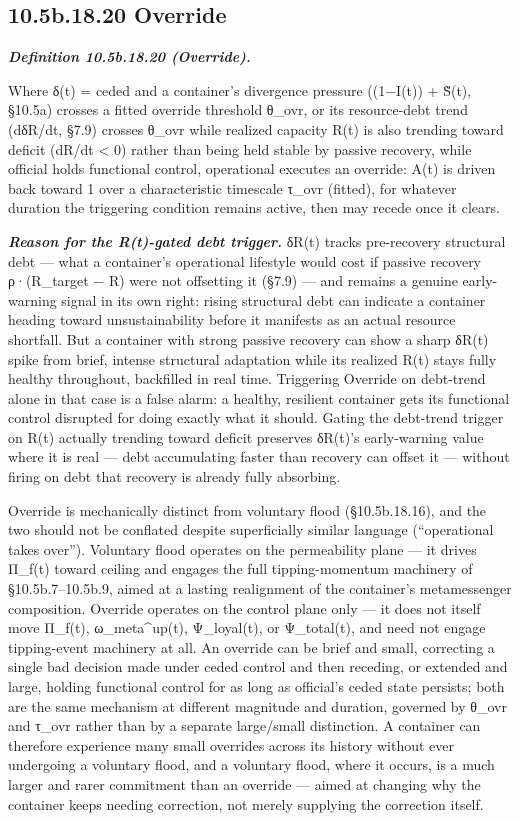 \documentclass[
]{article}
\begin{document}
\hypertarget{b.18.20-override}{%
\subsection{10.5b.18.20 Override}\label{b.18.20-override}}

\emph{\textbf{Definition 10.5b.18.20 (Override).}}

Where δ(t) = ceded and a container's divergence pressure ((1−I(t)) +
S̃(t), §10.5a) crosses a fitted override threshold θ\_ovr, or its
resource-debt trend (dδR/dt, §7.9) crosses θ\_ovr while realized
capacity R(t) is also trending toward deficit (dR/dt \textless{} 0)
rather than being held stable by passive recovery, while official holds
functional control, operational executes an override: A(t) is driven
back toward 1 over a characteristic timescale τ\_ovr (fitted), for
whatever duration the triggering condition remains active, then may
recede once it clears.

\emph{\textbf{Reason for the R(t)-gated debt trigger.}} δR(t) tracks
pre-recovery structural debt --- what a container's operational
lifestyle would cost if passive recovery ρ·(R\_target − R) were not
offsetting it (§7.9) --- and remains a genuine early-warning signal in
its own right: rising structural debt can indicate a container heading
toward unsustainability before it manifests as an actual resource
shortfall. But a container with strong passive recovery can show a sharp
δR(t) spike from brief, intense structural adaptation while its realized
R(t) stays fully healthy throughout, backfilled in real time. Triggering
Override on debt-trend alone in that case is a false alarm: a healthy,
resilient container gets its functional control disrupted for doing
exactly what it should. Gating the debt-trend trigger on R(t) actually
trending toward deficit preserves δR(t)'s early-warning value where it
is real --- debt accumulating faster than recovery can offset it ---
without firing on debt that recovery is already fully absorbing.

Override is mechanically distinct from voluntary flood (§10.5b.18.16),
and the two should not be conflated despite superficially similar
language (``operational takes over''). Voluntary flood operates on the
permeability plane --- it drives Π\_f(t) toward ceiling and engages the
full tipping-momentum machinery of §10.5b.7--10.5b.9, aimed at a lasting
realignment of the container's metamessenger composition. Override
operates on the control plane only --- it does not itself move Π\_f(t),
ω\_meta\^{}up(t), Ψ\_loyal(t), or Ψ\_total(t), and need not engage
tipping-event machinery at all. An override can be brief and small,
correcting a single bad decision made under ceded control and then
receding, or extended and large, holding functional control for as long
as official's ceded state persists; both are the same mechanism at
different magnitude and duration, governed by θ\_ovr and τ\_ovr rather
than by a separate large/small distinction. A container can therefore
experience many small overrides across its history without ever
undergoing a voluntary flood, and a voluntary flood, where it occurs, is
a much larger and rarer commitment than an override --- aimed at
changing why the container keeps needing correction, not merely
supplying the correction itself.
\end{document}
